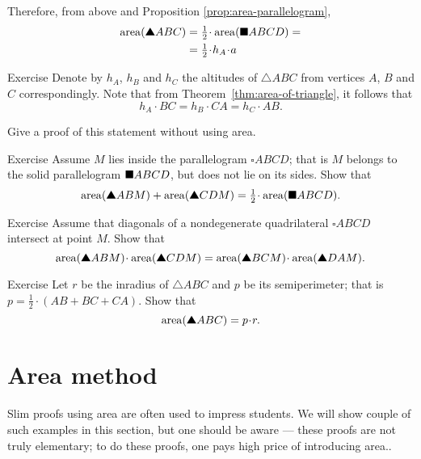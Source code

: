 Therefore, from above and Proposition \ref{prop:area-parallelogram},
\begin{align*}
\area(\solidtriangle ABC)
&=\tfrac12\cdot\area(\solidsquare ABCD)=
\\
&=\tfrac12\cdot h_A\cdot a
\end{align*}
\qedsf

\begin{thm}{Exercise}\label{ex:three-trig}
Denote by $h_A$, $h_B$ and $h_C$
the altitudes of $\triangle ABC$ from vertices $A$, $B$ and $C$ correspondingly.
Note that from Theorem~\ref{thm:area-of-triangle},
it follows that
\[h_A\cdot BC=h_B\cdot CA=h_C\cdot AB.\]

Give a proof of this statement without using area.
\end{thm}

\begin{thm}{Exercise}\label{ex:half-parallelogram}
Assume $M$ lies inside the parallelogram $\square ABCD$;
that is $M$ belongs to the solid parallelogram $\blacksquare ABCD$, but does not lie on its sides.
Show that
\[\area(\solidtriangle ABM)+\area(\solidtriangle CDM)
=\tfrac12\cdot \area(\solidsquare ABCD).\]
\end{thm}


\begin{thm}{Exercise}\label{ex:area-diag}
Assume that diagonals 
of a nondegenerate quadrilateral $\square ABCD$ 
intersect at point $M$.
Show that 
\[\area(\solidtriangle ABM)\cdot\area(\solidtriangle CDM)
=
\area(\solidtriangle BCM)\cdot\area(\solidtriangle DAM).\]
 
\end{thm}

\begin{thm}{Exercise}\label{ex:area-inradius}
Let $r$ be the inradius of $\triangle ABC$
and $p$ be its semiperimeter; 
that is $p=\tfrac12\cdot(AB+BC+CA)$.
Show that
\[\area(\solidtriangle ABC)=p\cdot r.\]

\end{thm}




\section*{Area method}

Slim proofs using area 
are often used to impress students.
We will show couple of such examples in this section,
but one should be aware --- these proofs are not truly elementary; to do these proofs, 
one pays high price of introducing area..

